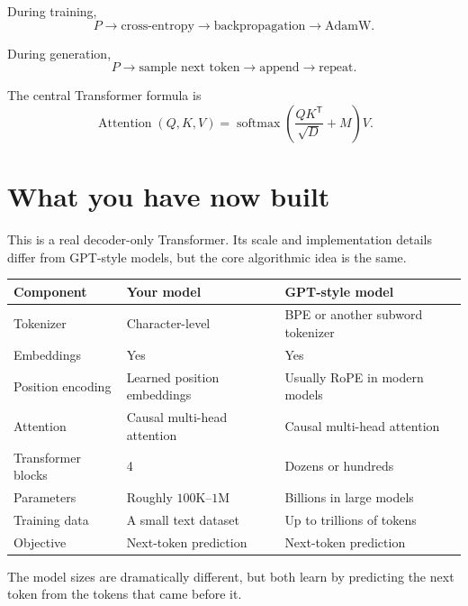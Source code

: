 During training,
\[
  P\longrightarrow\text{cross-entropy}
  \longrightarrow\text{backpropagation}
  \longrightarrow\text{AdamW}.
\]

During generation,
\[
  P\longrightarrow\text{sample next token}
  \longrightarrow\text{append}
  \longrightarrow\text{repeat}.
\]

The central Transformer formula is
\[
  \boxed{
    \operatorname{Attention}(Q,K,V)
    =\operatorname{softmax}\!\left(
      \frac{QK^{\mathsf T}}{\sqrt{D}}+M
    \right)V
  }.
\]

\section{What you have now built}

This is a real decoder-only Transformer. Its scale and implementation details
differ from GPT-style models, but the core algorithmic idea is the same.

\begin{center}
\renewcommand{\arraystretch}{1.25}
\begin{tabular}{@{}p{}p{}p{}@{}}
  \textbf{Component} & \textbf{Your model} & \textbf{GPT-style model} \\
  \hline
  Tokenizer & Character-level & BPE or another subword tokenizer \\
  Embeddings & Yes & Yes \\
  Position encoding & Learned position embeddings & Usually RoPE in modern models \\
  Attention & Causal multi-head attention & Causal multi-head attention \\
  Transformer blocks & 4 & Dozens or hundreds \\
  Parameters & Roughly \(100\text{K}\)--\(1\text{M}\) & Billions in large models \\
  Training data & A small text dataset & Up to trillions of tokens \\
  Objective & Next-token prediction & Next-token prediction
\end{tabular}
\end{center}

The model sizes are dramatically different, but both learn by predicting the
next token from the tokens that came before it.

